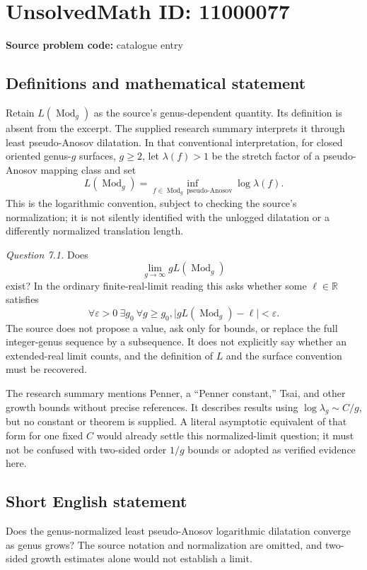 \documentclass[11pt]{article}
\newcommand{\R}{\mathbb{R}}
\newcommand{\eps}{\varepsilon}
\begin{document}
\section*{UnsolvedMath ID: 11000077}
\textbf{Source problem code:} catalogue entry
\subsection{Definitions and mathematical statement}
Retain \(L(\operatorname{Mod}_g)\) as the source's genus-dependent quantity. Its definition is absent from the excerpt. The supplied research summary interprets it through least pseudo-Anosov dilatation. In that conventional interpretation, for closed oriented genus-\(g\) surfaces, \(g\geq2\), let \(\lambda(f)>1\) be the stretch factor of a pseudo-Anosov mapping class and set
\[
 L(\operatorname{Mod}_g)
 =\inf_{f\in\operatorname{Mod}_g\ \mathrm{pseudo\text{-}Anosov}}\log\lambda(f).
\]
This is the logarithmic convention, subject to checking the source's normalization; it is not silently identified with the unlogged dilatation or a differently normalized translation length.

\emph{Question 7.1.} Does
\[
 \lim_{g\to\infty}gL(\operatorname{Mod}_g)
\]
exist? In the ordinary finite-real-limit reading this asks whether some \(\ell\in\R\) satisfies
\[
 \forall\eps>0\ \exists g_0\ \forall g\geq g_0,
 \bigl|gL(\operatorname{Mod}_g)-\ell\bigr|<\eps.
\]
The source does not propose a value, ask only for bounds, or replace the full integer-genus sequence by a subsequence. It does not explicitly say whether an extended-real limit counts, and the definition of \(L\) and the surface convention must be recovered.

The research summary mentions Penner, a ``Penner constant,'' Tsai, and other growth bounds without precise references. It describes results using \(\log\lambda_g\sim C/g\), but no constant or theorem is supplied. A literal asymptotic equivalent of that form for one fixed \(C\) would already settle this normalized-limit question; it must not be confused with two-sided order \(1/g\) bounds or adopted as verified evidence here.
\subsection{Short English statement}
Does the genus-normalized least pseudo-Anosov logarithmic dilatation converge as genus grows? The source notation and normalization are omitted, and two-sided growth estimates alone would not establish a limit.
\end{document}
